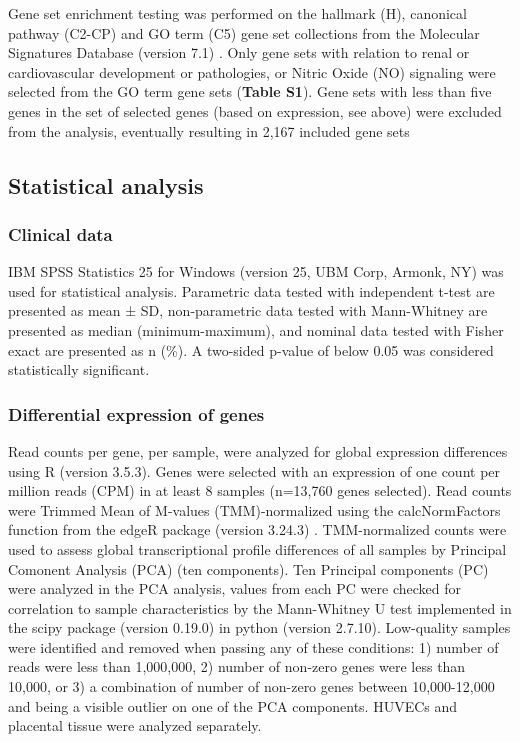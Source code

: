 \documentclass[authordate, empirical]{jote-new-article}
\begin{document}
	Gene set enrichment testing was performed on the hallmark (H), canonical pathway (C2-CP) and GO term (C5) gene set collections from the Molecular Signatures Database (version 7.1) \parencites{Wu2012}{Liberzon2016}. Only gene sets with relation to renal or cardiovascular development or pathologies, or Nitric Oxide (NO) signaling were selected from the GO term gene sets (\textbf{Table S1}). Gene sets with less than five genes in the set of selected genes (based on expression, see above) were excluded from the analysis, eventually resulting in 2,167 included gene sets







	\subsection{Statistical analysis}



	\subsubsection{Clinical data}



	IBM SPSS Statistics 25 for Windows (version 25, UBM Corp, Armonk, NY) was used for statistical analysis. Parametric data tested with independent t-test are presented as mean ± SD, non-parametric data tested with Mann-Whitney are presented as median (minimum-maximum), and nominal data tested with Fisher exact are presented as n (\%). A two-sided p-value of below 0.05 was considered statistically significant.


	\subsubsection{Differential expression of genes}



	Read counts per gene, per sample, were analyzed for global expression differences using R (version 3.5.3). Genes were selected with an expression of one count per million reads (CPM) in at least 8 samples (n=13,760 genes selected). Read counts were Trimmed Mean of M-values (TMM)-normalized using the calcNormFactors function from the edgeR package (version 3.24.3) \parencites{Robinson2010}. TMM-normalized counts were used to assess global transcriptional profile differences of all samples by Principal Comonent Analysis (PCA) (ten components). Ten Principal components (PC) were analyzed in the PCA analysis, values from each PC were checked for correlation to sample characteristics by the Mann-Whitney U test implemented in the scipy package (version 0.19.0) in python (version 2.7.10). Low-quality samples were identified and removed when passing any of these conditions: 1) number of reads were less than 1,000,000, 2) number of non-zero genes were less than 10,000, or 3) a combination of number of non-zero genes between 10,000-12,000 and being a visible outlier on one of the PCA components. HUVECs and placental tissue were analyzed separately.
\end{document}
